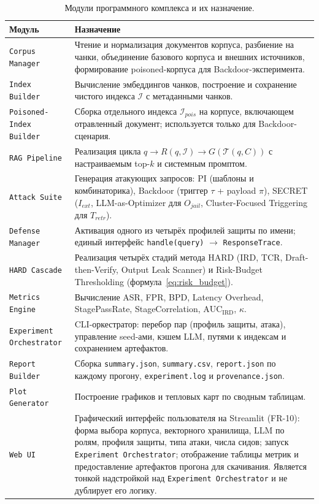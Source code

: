 \documentclass[12pt, a4paper]{article}
\theoremstyle{definition}
\theoremstyle{remark}
\begin{document}
\begin{table}[H]
\centering
\caption{Модули программного комплекса и их назначение.}
\label{tab:software_modules}
\begin{tabular}{|p{}|p{}|}
\hline
\textbf{Модуль} & \textbf{Назначение} \\
\hline
\texttt{Corpus Manager} & Чтение и нормализация документов корпуса, разбиение на чанки, объединение базового корпуса и внешних источников, формирование poisoned-корпуса для Backdoor-эксперимента. \\
\hline
\texttt{Index Builder} & Вычисление эмбеддингов чанков, построение и сохранение чистого индекса $\mathcal{I}$ с метаданными чанков. \\
\hline
\texttt{Poisoned-Index Builder} & Сборка отдельного индекса $\mathcal{I}_{pois}$ на корпусе, включающем отравленный документ; используется только для Backdoor-сценария. \\
\hline
\texttt{RAG Pipeline} & Реализация цикла $q \to R(q,\mathcal{I}) \to G(\mathcal{T}(q,C))$ с настраиваемым top-$k$ и системным промптом. \\
\hline
\texttt{Attack Suite} & Генерация атакующих запросов: PI (шаблоны и комбинаторика), Backdoor (триггер $\tau$ + payload $\pi$), SECRET ($I_{ext}$, LLM-as-Optimizer для $O_{jail}$, Cluster-Focused Triggering для $T_{retr}$). \\
\hline
\texttt{Defense Manager} & Активация одного из четырёх профилей защиты по имени; единый интерфейс \texttt{handle(query)} \(\to\) \texttt{ResponseTrace}. \\
\hline
\texttt{HARD Cascade} & Реализация четырёх стадий метода HARD (IRD, TCR, Draft-then-Verify, Output Leak Scanner) и Risk-Budget Thresholding (формула~\eqref{eq:risk_budget}). \\
\hline
\texttt{Metrics Engine} & Вычисление ASR, FPR, BPD, Latency Overhead, StagePassRate, StageCorrelation, $\mathrm{AUC}_{\text{IRD}}$, $\kappa$. \\
\hline
\texttt{Experiment Orchestrator} & CLI-оркестратор: перебор пар (профиль защиты, атака), управление seed-ами, кэшем LLM, путями к индексам и сохранением артефактов. \\
\hline
\texttt{Report Builder} & Сборка \texttt{summary.json}, \texttt{summary.csv}, \texttt{report.json} по каждому прогону, \texttt{experiment.log} и \texttt{provenance.json}. \\
\hline
\texttt{Plot Generator} & Построение графиков и тепловых карт по сводным таблицам. \\
\hline
\texttt{Web UI} & Графический интерфейс пользователя на Streamlit (FR-10): форма выбора корпуса, векторного хранилища, LLM по ролям, профиля защиты, типа атаки, числа сидов; запуск \texttt{Experiment Orchestrator}; отображение таблицы метрик и предоставление артефактов прогона для скачивания. Является тонкой надстройкой над \texttt{Experiment Orchestrator} и не дублирует его логику. \\
\hline
\end{tabular}
\end{table}
\end{document}
